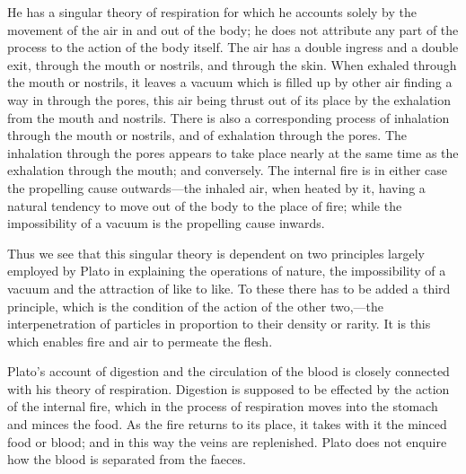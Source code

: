 He has a singular theory of respiration for which he accounts solely by
the movement of the air in and out of the body; he does not attribute any
part of the process to the action of the body itself. The air has a double
ingress and a double exit, through the mouth or nostrils, and through the
skin. When exhaled through the mouth or nostrils, it leaves a vacuum which
is filled up by other air finding a way in through the pores, this air
being thrust out of its place by the exhalation from the mouth and
nostrils. There is also a corresponding process of inhalation through the
mouth or nostrils, and of exhalation through the pores. The inhalation
through the pores appears to take place nearly at the same time as the
exhalation through the mouth; and conversely. The internal fire is in
either case the propelling cause outwards—the inhaled air, when
heated by it, having a natural tendency to move out of the body to the
place of fire; while the impossibility of a vacuum is the propelling cause
inwards.

Thus we see that this singular theory is dependent on two principles
largely employed by Plato in explaining the operations of nature, the
impossibility of a vacuum and the attraction of like to like. To these
there has to be added a third principle, which is the condition of the
action of the other two,—the interpenetration of particles in
proportion to their density or rarity. It is this which enables fire and
air to permeate the flesh.

Plato’s account of digestion and the circulation of the blood is closely
connected with his theory of respiration. Digestion is supposed to be
effected by the action of the internal fire, which in the process of
respiration moves into the stomach and minces the food. As the fire
returns to its place, it takes with it the minced food or blood; and in
this way the veins are replenished. Plato does not enquire how the blood
is separated from the faeces.


